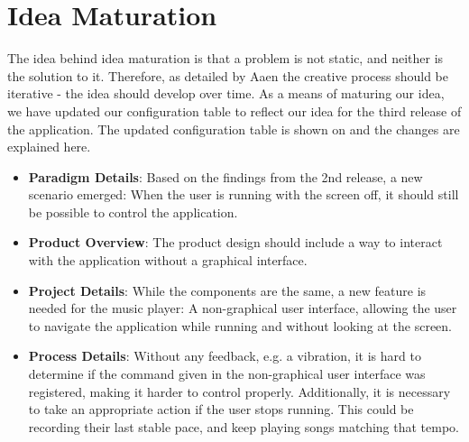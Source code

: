 \section{Idea Maturation}
The idea behind idea maturation is that a problem is not static, and neither is the solution to it. Therefore, as detailed by Aaen  \citep[ pp. 159-162]{essence} the creative process should be iterative - the idea should develop over time.
As a means of maturing our idea, we have updated our configuration table to reflect our idea for the third release of the application.
The updated configuration table is shown on  and the changes are explained here.



\begin{itemize}
\item \textbf{Paradigm Details}: Based on the findings from the 2nd release, a new scenario emerged: When the user is running with the screen off, it should still be possible to control the application.

\item \textbf{Product Overview}: The product design should include a way to interact with the application without a graphical interface.

\item \textbf{Project Details}: While the components are the same, a new feature is needed for the music player: A non-graphical user interface, allowing the user to navigate the application while running and without looking at the screen.

\item \textbf{Process Details}: Without any  feedback, e.g. a vibration, it is hard to determine if the command given in the non-graphical user interface was registered, making it harder to control properly. \newline
Additionally, it is necessary to take an appropriate action if the user stops running. This could be recording their last stable pace, and keep playing songs matching that tempo.
\end{itemize}